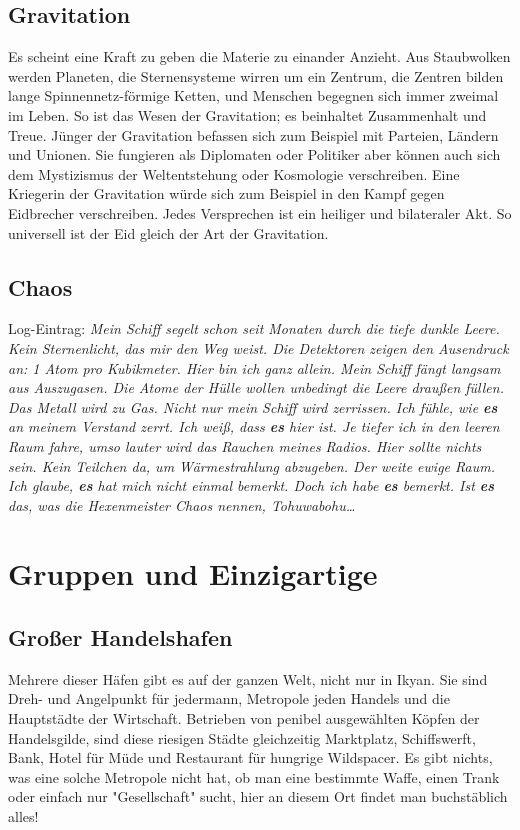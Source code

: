 \documentclass{book}
\begin{document}
\section{Gravitation}
Es scheint eine Kraft zu geben die Materie zu einander Anzieht. Aus Staubwolken werden Planeten, die Sternensysteme wirren um ein Zentrum, die Zentren bilden lange Spinnennetz-förmige Ketten, und Menschen begegnen sich immer zweimal im Leben. So ist das Wesen der Gravitation; es beinhaltet Zusammenhalt und Treue. Jünger der Gravitation befassen sich zum Beispiel mit Parteien, Ländern und Unionen. Sie fungieren als Diplomaten oder Politiker aber können auch sich dem Mystizismus der Weltentstehung oder Kosmologie verschreiben. Eine Kriegerin der Gravitation würde sich zum Beispiel in den Kampf gegen Eidbrecher verschreiben. Jedes Versprechen ist ein heiliger und bilateraler Akt. So universell ist der Eid gleich der Art der Gravitation.

\section{Chaos}
Log-Eintrag: {\it Mein Schiff segelt schon seit Monaten durch die tiefe dunkle Leere. Kein Sternenlicht, das mir den Weg weist. Die Detektoren zeigen den Ausendruck an: 1 Atom pro Kubikmeter. Hier bin ich ganz allein. Mein Schiff fängt langsam aus Auszugasen. Die Atome der Hülle wollen unbedingt die Leere draußen füllen. Das Metall wird zu Gas. Nicht nur mein Schiff wird zerrissen. Ich fühle, wie {\bf es} an meinem Verstand zerrt. Ich weiß, dass {\bf es} hier ist. Je tiefer ich in den leeren Raum fahre, umso lauter wird das Rauchen meines Radios. Hier sollte nichts sein. Kein Teilchen da, um Wärmestrahlung abzugeben. Der weite ewige Raum. Ich glaube, {\bf es} hat mich nicht einmal bemerkt. Doch ich habe {\bf es} bemerkt. Ist {\bf es} das, was die Hexenmeister Chaos nennen, Tohuwabohu\dots}

\chapter{Gruppen und Einzigartige}

\section{Großer Handelshafen}
Mehrere dieser Häfen gibt es auf der ganzen Welt, nicht nur in Ikyan.
Sie sind Dreh- und Angelpunkt für jedermann, Metropole jeden Handels und die Hauptstädte der Wirtschaft.
Betrieben von penibel ausgewählten Köpfen der Handelsgilde, sind diese riesigen Städte gleichzeitig Marktplatz, Schiffswerft, Bank, Hotel für Müde und Restaurant für hungrige Wildspacer. Es gibt nichts, was eine solche Metropole nicht hat, ob man eine bestimmte Waffe, einen Trank oder einfach nur "Gesellschaft" sucht, hier an diesem Ort findet man buchstäblich alles!
\end{document}
